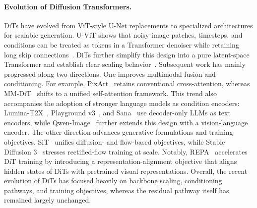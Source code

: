 \documentclass[]{ant_tech_report}
\begin{document}
\paragraph{Evolution of Diffusion Transformers.} DiTs have evolved from ViT-style U-Net replacements to specialized architectures for scalable generation. U-ViT shows that noisy image patches, timesteps, and conditions can be treated as tokens in a Transformer denoiser while retaining long skip connections~\citep{bao2023all}. DiTs further simplify this design into a pure latent-space Transformer and establish clear scaling behavior~\citep{peebles2023scalable}. Subsequent work has mainly progressed along two directions. One improves multimodal fusion and conditioning. For example, PixArt~\citep{chen2024pixart, chen2023pixart, chen2024pixartdelta} retains conventional cross-attention, whereas MM-DiT~\citep{esser2024scaling} shifts to a unified self-attention framework. This trend also accompanies the adoption of stronger language models as condition encoders: Lumina-T2X~\citep{gao2024lumina}, Playground v3~\citep{Liu2024PlaygroundVI}, and Sana~\citep{xie2024sana} use decoder-only LLMs as text encoders, while Qwen-Image~\citep{wu2025qwen} further extends this design with a vision-language encoder. The other direction advances generative formulations and training objectives. SiT~\citep{ma2024sit} unifies diffusion- and flow-based objectives, while Stable Diffusion 3~\citep{esser2024scaling} stresses rectified-flow training at scale. Notably, REPA~\citep{yu2025repa} accelerates DiT training by introducing a representation-alignment objective that aligns hidden states of DiTs with pretrained visual representations. Overall, the recent evolution of DiTs has focused heavily on backbone scaling, conditioning pathways, and training objectives, whereas the residual pathway itself has remained largely unchanged.


\end{document}
